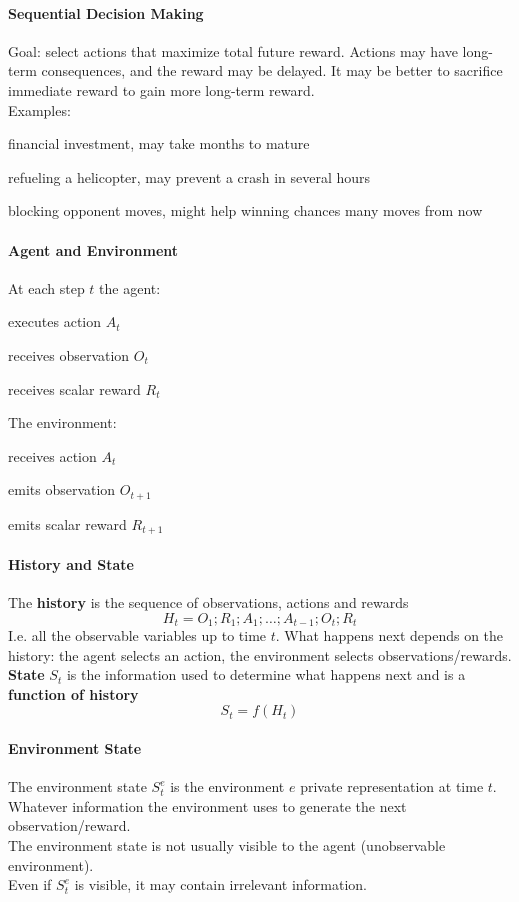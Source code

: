 \documentclass[10pt]{report}
\begin{document}
\paragraph{Sequential Decision Making} Goal: select actions that maximize total future reward. Actions may have long-term consequences, and the reward may be delayed. It may be better to sacrifice immediate reward to gain more long-term reward.\\
Examples:
\begin{list}{}{}
	\item financial investment, may take months to mature
	\item refueling a helicopter, may prevent a crash in several hours
	\item blocking opponent moves, might help winning chances many moves from now
\end{list}
\paragraph{Agent and Environment} At each step $t$ the agent:
\begin{list}{}{}
	\item executes action $A_t$
	\item receives observation $O_t$
	\item receives scalar reward $R_t$
\end{list}
The environment:
\begin{list}{}{}
	\item receives action $A_t$
	\item emits observation $O_{t+1}$
	\item emits scalar reward $R_{t+1}$
\end{list}
\paragraph{History and State} The \textbf{history} is the sequence of observations, actions and rewards
$$H_t = O_1;R_1;A_1;\ldots;A_{t-1};O_t;R_t$$
I.e. all the observable variables up to time $t$. What happens next depends on the history: the agent selects an action, the environment selects observations/rewards.\\
\textbf{State} $S_t$ is the information used to determine what happens next and is a \textbf{function of history}
$$S_t = f(H_t)$$
\paragraph{Environment State} The environment state $S_t^e$ is the environment $e$ private representation at time $t$. Whatever information the environment uses to generate the next observation/reward.\\
The environment state is not usually visible to the agent (unobservable environment).\\
Even if $S_t^e$ is visible, it may contain irrelevant information.
\end{document}
